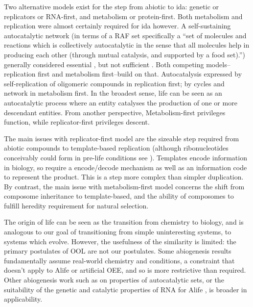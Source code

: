 \begin{mdframed}[style=box, frametitle={The orgins of life}]

Two alternative models exist for the step from abiotic to \gls{ida}: genetic or replicators or RNA-first, and metabolism or protein-first. Both metabolism and replication were almost certainly required for \gls{ida} however. A self-sustaining autocatalytic network (in terms of a RAF set specifically a ``set of molecules and reactions which is collectively autocatalytic in the sense that all molecules help in producing each other (through mutual catalysis, and supported by a food set).'') generally considered essential \parencite{Pross2013}, but not sufficient \parencite{Hordijk2011}. Both competing models--replication first and metabolism first--build on that. Autocatalysis expressed by self-replication of oligomeric compounds in replication first; by cycles and network in metabolism first. In the broadest sense, life can be seen as an autocatalytic process where an entity catalyses the production of one or more descendant entities.
From another perspective, Metabolism-first privileges function, while replicator-first privileges descent.

The main issues with replicator-first model are the sizeable step required from abiotic compounds to template-based replication (although ribonucleotides conceivably could form in pre-life conditions see \parencite{Powner2009}). Templates encode information in biology, so require a encode/decode mechanism as well as an information code to represent the product. This is a step more complex than simpler duplication. By contrast, the main issue with metabolism-first model concerns the shift from composome inheritance to template-based, and the ability of composomes to fulfill heredity requirement for natural selection.

The origin of life can be seen as the transition from chemistry to biology, and is analogous to our goal of transitioning from simple uninteresting systems, to systems which evolve. However, the usefulness of the similarity is limited: the primary postulates of OOL are not our postulates. Some abiogenesis results fundamentally assume real-world chemistry and
conditions, a constraint that doesn't apply to Alife or artificial OEE, and so is more restrictive than required. Other abiogenesis work such as on properties of autocatalytic sets, or the suitability of the genetic and catalytic properties of RNA for Alife \parencite{Cheng2010}, is broader in applicability.
\end{mdframed}

